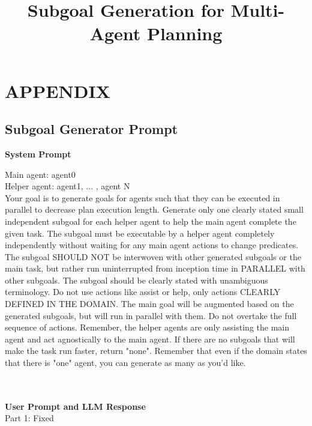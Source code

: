 \documentclass[12pt,a4paper]{article}
\begin{document}
\title{Subgoal Generation for Multi-Agent Planning}
\author{}
\date{}
\maketitle

\section*{APPENDIX}
\subsection{Subgoal Generator Prompt}
\noindent \textbf{System Prompt}\\
\colorbox{blue!10}{
\begin{minipage}{0.95\columnwidth}
Main agent: agent0\\
Helper agent: agent1, ... , agent N\\
Your goal is to generate goals for agents such that they can be executed in parallel to decrease plan execution length. Generate only one clearly stated small independent subgoal for each helper agent to help the main agent complete the given task. The subgoal must be executable by a helper agent completely independently without waiting for any main agent actions to change predicates. The subgoal SHOULD NOT be interwoven with other generated subgoals or the main task, but rather run uninterrupted from inception time in PARALLEL with other subgoals.  
The subgoal should be clearly stated with unambiguous terminology. Do not use actions like assist or help, only actions CLEARLY DEFINED IN THE DOMAIN. The main goal will be augmented based on the generated subgoals, but will run in parallel with them. Do not overtake the full sequence of actions. Remember, the helper agents are only assisting the main agent and act agnostically to the main agent. If there are no subgoals that will make the task run faster, return "none". Remember that even if the domain states that there is "one" agent, you can generate as many as you'd like.
\end{minipage}
} \\ \\
\noindent \textbf{User Prompt and LLM Response}\\
Part 1: Fixed \\
\end{document}
